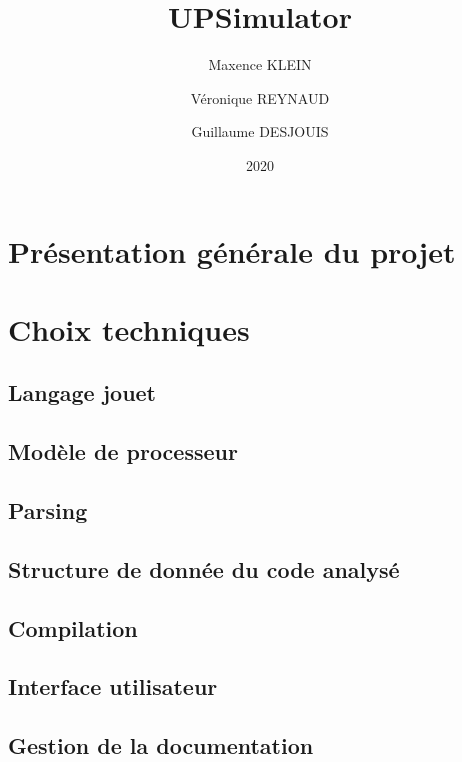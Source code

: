 \documentclass[10pt]{scrreprt} %
\title{UPSimulator}
\author{Maxence KLEIN\\ \and Véronique REYNAUD\\ \and Guillaume DESJOUIS }
\date{2020}
\begin{document}
\maketitle
\tableofcontents
\clearpage

\section{Présentation générale du projet}



\clearpage
\section{Choix techniques}
\subsection{Langage jouet}



\clearpage

\subsection{\label{sec:processeur}Modèle de processeur}


\subsection{\label{sec:Parsing}Parsing}




\subsection{\label{sec:ParsedCode}Structure de donnée du code analysé}


\clearpage
\subsection{Compilation}


\clearpage
\subsection{\label{sec:interface}Interface utilisateur}


\clearpage
\subsection{Gestion de la documentation}

\end{document}
